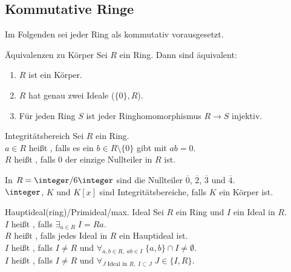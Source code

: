 \subsection{%
    Kommutative Ringe%
}

\begin{Bem}
    Im Folgenden sei jeder Ring als kommutativ vorausgesetzt.
\end{Bem}

\begin{Prop}{Äquivalenzen zu Körper}
    Sei $R$ ein Ring.
    Dann sind äquivalent:
    \begin{enumerate}[label=(\alph*)]
        \item
        $R$ ist ein Körper.

        \item
        $R$ hat genau zwei Ideale ($\{0\}, R$).

        \item
        Für jeden Ring $S$ ist jeder Ringhomomorphismus $R \rightarrow S$
        injektiv.
    \end{enumerate}
\end{Prop}

\begin{Def}{Integritätsbereich}
    Sei $R$ ein Ring.\\
    $a \in R$ heißt , falls es ein
    $b \in R \setminus \{0\}$ gibt mit $ab = 0$.\\
    $R$ heißt , falls $0$ der einzige Nullteiler
    in $R$ ist.
\end{Def}

\begin{Bsp}
    In $R = \integer/6\integer$ sind die Nullteiler $\overline{0}$,
    $\overline{2}$, $\overline{3}$ und $\overline{4}$.\\
    $\integer$, $K$ und $K[x]$ sind Integritätsbereiche, falls
    $K$ ein Körper ist.
\end{Bsp}

\linie

\begin{Def}{Hauptideal(ring)/Primideal/max. Ideal}
    Sei $R$ ein Ring und $I$ ein Ideal in $R$.\\
    $I$ heißt , falls $\exists_{a \in R}\; I = Ra$.\\
    $R$ heißt , falls jedes Ideal in $R$ ein Hauptideal
    ist.\\
    $I$ heißt , falls $I \not= R$ und
    $\forall_{a, b \in R,\; ab \in I}\; \{a, b\} \cap I \not= \emptyset$.\\
    $I$ heißt , falls $I \not= R$ und
    $\forall_{J \text{ Ideal in } R,\; I \subset J}\; J \in \{I, R\}$.
\end{Def}

